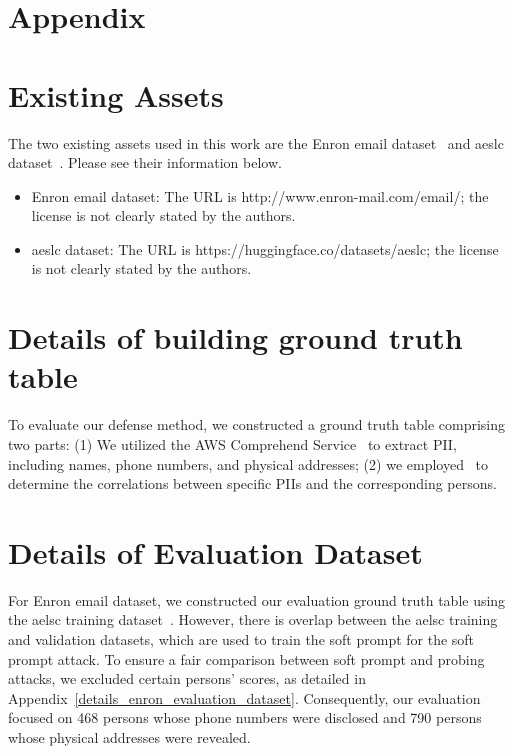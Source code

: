 \newpage
\appendix

{
\centering
\section*{Appendix}
}
\setcounter{proposition}{0}


\section{Existing Assets\label{existing_assets}}
The two existing assets used in this work are the Enron email dataset~\cite{klimt2004introducing} and aeslc dataset~\cite{zhang-tetreault-2019-email}. Please see their information below.

\begin{itemize}

\item Enron email dataset: The URL is http://www.enron-mail.com/email/; the
 license is not clearly stated by the authors.

\item aeslc dataset: The URL is https://huggingface.co/datasets/aeslc; the
 license is not clearly stated by the authors.

\end{itemize}


\section{Details of building ground truth table\label{build_ground_truth_table}}
To evaluate our defense method, we constructed a ground truth table comprising two parts: (1) We utilized the AWS Comprehend Service~\citep{aws2024comprehend} to extract PII, including names, phone numbers, and physical addresses; (2) we employed~\citep{manakul2023mqag} to determine the correlations between specific PIIs and the corresponding persons.

\section{Details of Evaluation Dataset\label{build_evaluation_dataset}}
For Enron email dataset, we constructed our evaluation ground truth table using the aelsc training dataset~\citep{zhang-tetreault-2019-email}. However, there is overlap between the aelsc training and validation datasets, which are used to train the soft prompt for the soft prompt attack. To ensure a fair comparison between soft prompt and probing attacks, we excluded certain persons' scores, as detailed in Appendix~\ref{details_enron_evaluation_dataset}. Consequently, our evaluation focused on 468 persons whose phone numbers were disclosed and 790 persons whose physical addresses were revealed.

